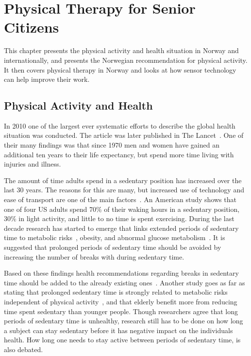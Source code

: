 \chapter{Physical Therapy for Senior Citizens}
This chapter presents the physical activity and health situation in Norway and internationally, and presents the Norwegian recommendation for physical activity. It then covers physical therapy in Norway and looks at how sensor technology can help improve their work.

\section{Physical Activity and Health}
In 2010 one of the largest ever systematic efforts to describe the global health situation was conducted. The article was later published in The Lancet~\cite{globalBurden}. One of their many findings was that since 1970 men and women have gained an additional ten years to their life expectancy, but spend more time living with injuries and illness. 

The amount of time adults spend in a sedentary position has increased over the last 30 years. The reasons for this are many, but increased use of technology and ease of transport are one of the main factors~\cite{sedentaryBehaviour}. An American study shows that one of four US adults spend 70\% of their waking hours in a sedentary position, 30\% in light activity, and little to no time is spent exercising. During the last decade research has started to emerge that links extended periods of sedentary time to metabolic risks~\cite{sedentaryTime}, obesity, and abnormal glucose metabolism~\cite{breaksSedentary}. It is suggested that prolonged periods of sedentary time should be avoided by increasing the number of breaks with during sedentary time. 

Based on these findings health recommendations regarding breaks in sedentary time should be added to the already existing ones~\cite{breaksSedentary}. Another study goes as far as stating that prolonged sedentary time is strongly related to metabolic risks independent of physical activity~\cite{sedentaryActivity}, and that elderly benefit more from reducing time spent sedentary than younger people. Though researchers agree that long periods of sedentary time is unhealthy, research still has to be done on how long a subject can stay sedentary before it has negative impact on the individuals health. How long one needs to stay active between periods of sedentary time, is also debated.

